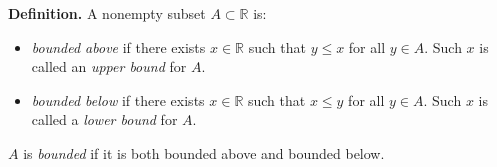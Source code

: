 \textbf{Definition.} A nonempty subset $A \subset \mathbb{R}$ is:
\begin{itemize}
\item \textit{bounded above} if there exists $x \in \mathbb{R}$ such that $y \leq x$ for all $y \in A$. Such $x$ is called an \textit{upper bound} for $A$.
\item \textit{bounded below} if there exists $x \in \mathbb{R}$ such that $x \leq y$ for all $y \in A$. Such $x$ is called a \textit{lower bound} for $A$.
\end{itemize}
$A$ is \textit{bounded} if it is both bounded above and bounded below.
